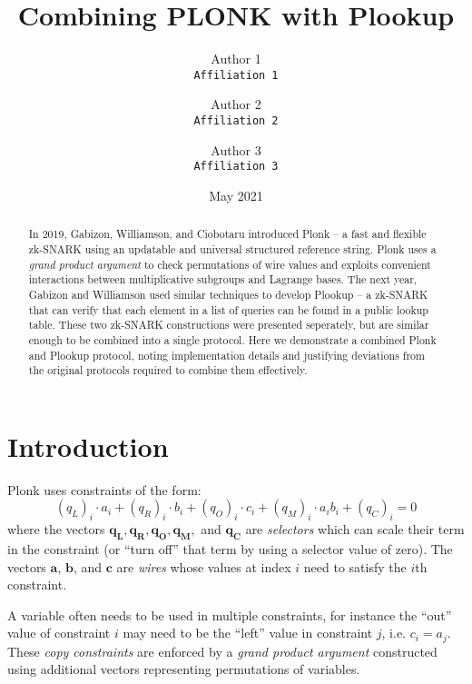 \documentclass[fleqn]{article}
\begin{document}
	\title{\textbf{Combining PLONK with Plookup}}
	\author{
		Author 1 \\
		\texttt{Affiliation 1}\\
	\and
		Author 2\\
		\texttt{Affiliation 2}\\
	\and
		Author 3\\
		\texttt{Affiliation 3}\\
	}
	\date{May 2021}
	\maketitle
	
	\begin{abstract}
		In 2019, Gabizon, Williamson, and Ciobotaru introduced Plonk -- a fast and flexible zk-SNARK using an updatable and universal structured reference string. Plonk uses a \emph{grand product argument} to check permutations of wire values and exploits convenient interactions between multiplicative subgroups and Lagrange bases. The next year, Gabizon and Williamson used similar techniques to develop Plookup -- a zk-SNARK that can verify that each element in a list of queries can be found in a public lookup table. These two zk-SNARK constructions were presented seperately, but are similar enough to be combined into a single protocol. Here we demonstrate a combined Plonk and Plookup protocol, noting implementation details and justifying deviations from the original protocols required to combine them effectively.
	\end{abstract}
	\section{Introduction}
		Plonk uses constraints of the form:
			\[(q_L)_i\cdot a_i+(q_R)_i\cdot b_i+(q_O)_i\cdot c_i+(q_M)_i\cdot a_i b_i+(q_C)_i = 0\]
			where the vectors $\mathbf{q_L}, \mathbf{q_R}, \mathbf{q_O}, \mathbf{q_M},$ and $\mathbf{q_C}$ are \emph{selectors} which can scale their term in the constraint (or ``turn off'' that term by using a selector value of zero). The vectors $\mathbf{a}$,  $\mathbf{b}$, and $\mathbf{c}$ are \emph{wires} whose values at index $i$ need to satisfy the $i$th constraint. 
			
		A variable often needs to be used in multiple constraints, for instance the ``out'' value of constraint $i$ may need to be the ``left'' value in constraint $j$, i.e. $c_i = a_j$. These \emph{copy constraints} are enforced by a \emph{grand product argument} constructed using additional vectors representing permutations of variables.  
		
\end{document}
